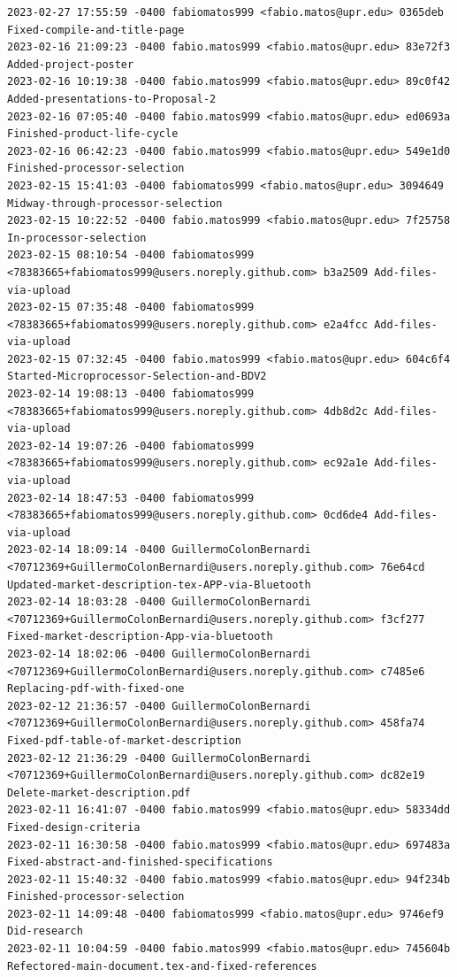 \documentclass[12pt]{article}
\begin{document}
\begin{verbatim}
2023-02-27 17:55:59 -0400 fabiomatos999 <fabio.matos@upr.edu> 0365deb Fixed-compile-and-title-page
2023-02-16 21:09:23 -0400 fabio.matos999 <fabio.matos@upr.edu> 83e72f3 Added-project-poster
2023-02-16 10:19:38 -0400 fabio.matos999 <fabio.matos@upr.edu> 89c0f42 Added-presentations-to-Proposal-2
2023-02-16 07:05:40 -0400 fabio.matos999 <fabio.matos@upr.edu> ed0693a Finished-product-life-cycle
2023-02-16 06:42:23 -0400 fabio.matos999 <fabio.matos@upr.edu> 549e1d0 Finished-processor-selection
2023-02-15 15:41:03 -0400 fabiomatos999 <fabio.matos@upr.edu> 3094649 Midway-through-processor-selection
2023-02-15 10:22:52 -0400 fabio.matos999 <fabio.matos@upr.edu> 7f25758 In-processor-selection
2023-02-15 08:10:54 -0400 fabiomatos999 <78383665+fabiomatos999@users.noreply.github.com> b3a2509 Add-files-via-upload
2023-02-15 07:35:48 -0400 fabiomatos999 <78383665+fabiomatos999@users.noreply.github.com> e2a4fcc Add-files-via-upload
2023-02-15 07:32:45 -0400 fabio.matos999 <fabio.matos@upr.edu> 604c6f4 Started-Microprocessor-Selection-and-BDV2
2023-02-14 19:08:13 -0400 fabiomatos999 <78383665+fabiomatos999@users.noreply.github.com> 4db8d2c Add-files-via-upload
2023-02-14 19:07:26 -0400 fabiomatos999 <78383665+fabiomatos999@users.noreply.github.com> ec92a1e Add-files-via-upload
2023-02-14 18:47:53 -0400 fabiomatos999 <78383665+fabiomatos999@users.noreply.github.com> 0cd6de4 Add-files-via-upload
2023-02-14 18:09:14 -0400 GuillermoColonBernardi <70712369+GuillermoColonBernardi@users.noreply.github.com> 76e64cd Updated-market-description-tex-APP-via-Bluetooth
2023-02-14 18:03:28 -0400 GuillermoColonBernardi <70712369+GuillermoColonBernardi@users.noreply.github.com> f3cf277 Fixed-market-description-App-via-bluetooth
2023-02-14 18:02:06 -0400 GuillermoColonBernardi <70712369+GuillermoColonBernardi@users.noreply.github.com> c7485e6 Replacing-pdf-with-fixed-one
2023-02-12 21:36:57 -0400 GuillermoColonBernardi <70712369+GuillermoColonBernardi@users.noreply.github.com> 458fa74 Fixed-pdf-table-of-market-description
2023-02-12 21:36:29 -0400 GuillermoColonBernardi <70712369+GuillermoColonBernardi@users.noreply.github.com> dc82e19 Delete-market-description.pdf
2023-02-11 16:41:07 -0400 fabio.matos999 <fabio.matos@upr.edu> 58334dd Fixed-design-criteria
2023-02-11 16:30:58 -0400 fabio.matos999 <fabio.matos@upr.edu> 697483a Fixed-abstract-and-finished-specifications
2023-02-11 15:40:32 -0400 fabio.matos999 <fabio.matos@upr.edu> 94f234b Finished-processor-selection
2023-02-11 14:09:48 -0400 fabiomatos999 <fabio.matos@upr.edu> 9746ef9 Did-research
2023-02-11 10:04:59 -0400 fabio.matos999 <fabio.matos@upr.edu> 745604b Refectored-main-document.tex-and-fixed-references

\end{verbatim}
\end{document}
